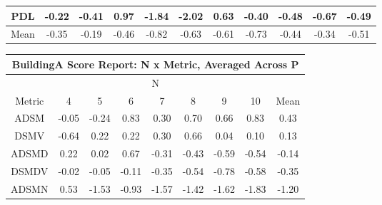 \begin{longtable}{ | c || c | c | c | c | c | c | c | c | c || c |}
PDL &  \cellcolor[HTML]{FFF7F7} -0.22 &  \cellcolor[HTML]{FFF7F7} -0.41 &  \cellcolor[HTML]{E7E7FF} 0.97 &  \cellcolor[HTML]{FFCFCF} -1.84 &  \cellcolor[HTML]{FFCFCF} -2.02 &  \cellcolor[HTML]{EFEFFF} 0.63 &  \cellcolor[HTML]{FFF7F7} -0.40 &  \cellcolor[HTML]{FFEFEF} -0.48 &  \cellcolor[HTML]{FFEFEF} -0.67 &  \cellcolor[HTML]{FFEFEF} -0.49 \\
\hline
\hline
Mean  &  \cellcolor[HTML]{FFF7F7} -0.35 &  \cellcolor[HTML]{FFF7F7} -0.19 &  \cellcolor[HTML]{FFF7F7} -0.46 &  \cellcolor[HTML]{FFE7E7} -0.82 &  \cellcolor[HTML]{FFEFEF} -0.63 &  \cellcolor[HTML]{FFEFEF} -0.61 &  \cellcolor[HTML]{FFEFEF} -0.73 &  \cellcolor[HTML]{FFF7F7} -0.44 &  \cellcolor[HTML]{FFF7F7} -0.34 &  \cellcolor[HTML]{FFEFEF} -0.51 \\
\hline
\end{longtable}
\begin{longtable}{ | c || c | c | c | c | c | c | c || c |}
\hline
\multicolumn{9}{|c|}{ BuildingA Score Report: N x Metric, Averaged Across P } \\
\hline
\multicolumn{9}{|c|}{ N } \\
\hline
Metric & 4 & 5 & 6 & 7 & 8 & 9 & 10 & Mean\\
\hline
\hline
\endhead
ADSM &  \cellcolor[HTML]{FFFFFF} -0.05 &  \cellcolor[HTML]{FFF7F7} -0.24 &  \cellcolor[HTML]{E7E7FF} 0.83 &  \cellcolor[HTML]{F7F7FF} 0.30 &  \cellcolor[HTML]{EFEFFF} 0.70 &  \cellcolor[HTML]{EFEFFF} 0.66 &  \cellcolor[HTML]{E7E7FF} 0.83 &  \cellcolor[HTML]{F7F7FF} 0.43 \\
DSMV &  \cellcolor[HTML]{FFEFEF} -0.64 &  \cellcolor[HTML]{F7F7FF} 0.22 &  \cellcolor[HTML]{F7F7FF} 0.22 &  \cellcolor[HTML]{F7F7FF} 0.30 &  \cellcolor[HTML]{EFEFFF} 0.66 &  \cellcolor[HTML]{FFFFFF} 0.04 &  \cellcolor[HTML]{FFFFFF} 0.10 &  \cellcolor[HTML]{FFFFFF} 0.13 \\
ADSMD &  \cellcolor[HTML]{F7F7FF} 0.22 &  \cellcolor[HTML]{FFFFFF} 0.02 &  \cellcolor[HTML]{EFEFFF} 0.67 &  \cellcolor[HTML]{FFF7F7} -0.31 &  \cellcolor[HTML]{FFF7F7} -0.43 &  \cellcolor[HTML]{FFEFEF} -0.59 &  \cellcolor[HTML]{FFEFEF} -0.54 &  \cellcolor[HTML]{FFFFFF} -0.14 \\
DSMDV &  \cellcolor[HTML]{FFFFFF} -0.02 &  \cellcolor[HTML]{FFFFFF} -0.05 &  \cellcolor[HTML]{FFFFFF} -0.11 &  \cellcolor[HTML]{FFF7F7} -0.35 &  \cellcolor[HTML]{FFEFEF} -0.54 &  \cellcolor[HTML]{FFEFEF} -0.78 &  \cellcolor[HTML]{FFEFEF} -0.58 &  \cellcolor[HTML]{FFF7F7} -0.35 \\
ADSMN &  \cellcolor[HTML]{EFEFFF} 0.53 &  \cellcolor[HTML]{FFD7D7} -1.53 &  \cellcolor[HTML]{FFE7E7} -0.93 &  \cellcolor[HTML]{FFD7D7} -1.57 &  \cellcolor[HTML]{FFDFDF} -1.42 &  \cellcolor[HTML]{FFD7D7} -1.62 &  \cellcolor[HTML]{FFCFCF} -1.83 &  \cellcolor[HTML]{FFDFDF} -1.20 \\

\end{longtable}
